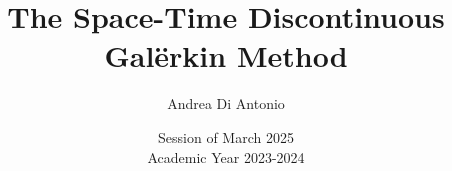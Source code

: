 
\newcommand{\documenttitle}{The Space-Time Discontinuous Galërkin Method}
\newcommand{\brokendocumenttitle}{The Space-Time \\ Discontinuous Galërkin Method}
\newcommand{\documentsubtitle}{Convection-Diffusion-Reaction Problems}

\newcommand{\documentauthor}{Andrea Di Antonio}
\newcommand{\documentdate}{Session of March 2025 \\ Academic Year 2023-2024}
\newcommand{\logo}{title/logo.pdf}

\author{\documentauthor}
\title{\documenttitle}
\date{\documentdate}